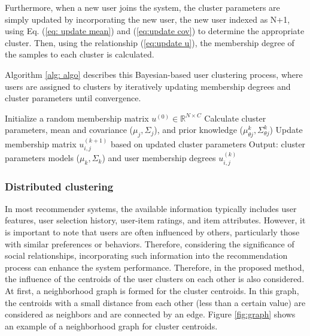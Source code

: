 \documentclass{article}
\begin{document}
Furthermore, when a new user joins the system, the cluster parameters are simply updated by incorporating the new user, the new user indexed as N+1,  using Eq. (\ref{eq: update mean}) and (\ref{eq:update cov}) to determine the appropriate cluster. Then, using the relationship (\ref{eq:update u}), the membership degree of the samples to each cluster is calculated.

Algorithm \ref{alg: algo} describes this Bayesian-based user clustering process, where users are assigned to clusters by iteratively updating membership degrees and cluster parameters until convergence.

\begin{algorithm}
\caption{Bayesian-based User Clustering}
\label{alg: algo}
\begin{algorithmic}[1]
\STATE Initialize a random membership matrix \( u^{(0)} \in \mathbb{R}^{N \times C} \)
\REPEAT
        \STATE Calculate cluster parameters, mean and covariance (\( \mu_j, \Sigma_j \)), and prior knowledge (\( \mu_{\theta j}^k, \Sigma_{\theta j}^k \))
    \ENDFOR
    \STATE Update membership matrix \( u_{i,j}^{(k+1)} \) based on updated cluster parameters
\STATE Output: cluster parameters models (\( \mu_k, \Sigma_k \)) and user membership degrees \( u_{i,j}^{(k)} \)
\end{algorithmic}
\end{algorithm}

\subsubsection{Distributed clustering}
In most recommender systems, the available information typically includes user features, user selection history, user-item ratings, and item attributes. However, it is important to note that users are often influenced by others, particularly those with similar preferences or behaviors. Therefore, considering the significance of social relationships, incorporating such information into the recommendation process can enhance the system performance.
Therefore, in the proposed method, the influence of the centroids of the user clusters on each other is also considered. At first, a neighborhood graph is formed for the cluster centroids. In this graph, the centroids with a small distance from each other (less than a certain value) are considered as neighbors and are connected by an edge. Figure \ref{fig:graph} shows an example of a neighborhood graph for cluster centroids.
\end{document}
